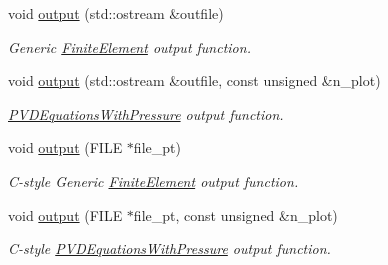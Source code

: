 \begin{DoxyCompactItemize}
void \hyperlink{classoomph_1_1QPVDElementWithPressure_a442248cc27256d32e674ab2ffc1aa032}{output} (std\+::ostream \&outfile)
\begin{DoxyCompactList}\small\item\em Generic \hyperlink{classoomph_1_1FiniteElement}{Finite\+Element} output function. \end{DoxyCompactList}\item 
void \hyperlink{classoomph_1_1QPVDElementWithPressure_ad47eebe6e14138c64fc313f3ecda8d6e}{output} (std\+::ostream \&outfile, const unsigned \&n\+\_\+plot)
\begin{DoxyCompactList}\small\item\em \hyperlink{classoomph_1_1PVDEquationsWithPressure}{P\+V\+D\+Equations\+With\+Pressure} output function. \end{DoxyCompactList}\item 
void \hyperlink{classoomph_1_1QPVDElementWithPressure_adf19767f05bb8227c56b011c3f6931e5}{output} (F\+I\+LE $\ast$file\+\_\+pt)
\begin{DoxyCompactList}\small\item\em C-\/style Generic \hyperlink{classoomph_1_1FiniteElement}{Finite\+Element} output function. \end{DoxyCompactList}\item 
void \hyperlink{classoomph_1_1QPVDElementWithPressure_a129f52703db667b9b67a2aa7a6f7fb3e}{output} (F\+I\+LE $\ast$file\+\_\+pt, const unsigned \&n\+\_\+plot)
\begin{DoxyCompactList}\small\item\em C-\/style \hyperlink{classoomph_1_1PVDEquationsWithPressure}{P\+V\+D\+Equations\+With\+Pressure} output function. \end{DoxyCompactList}\end{DoxyCompactItemize}
